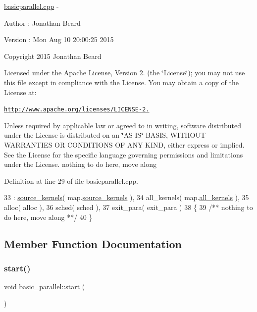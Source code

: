 \hyperlink{basicparallel_8cpp_source}{basicparallel.\+cpp} -\/ \begin{DoxyAuthor}{Author}
\+: Jonathan Beard 
\end{DoxyAuthor}
\begin{DoxyVersion}{Version}
\+: Mon Aug 10 20\+:00\+:25 2015
\end{DoxyVersion}
Copyright 2015 Jonathan Beard

Licensed under the Apache License, Version 2. (the \char`\"{}\+License\char`\"{}); you may not use this file except in compliance with the License. You may obtain a copy of the License at\+:

\href{http://www.apache.org/licenses/LICENSE-2.0}{\tt http\+://www.\+apache.\+org/licenses/\+L\+I\+C\+E\+N\+S\+E-\/2.}

Unless required by applicable law or agreed to in writing, software distributed under the License is distributed on an \char`\"{}\+A\+S I\+S\char`\"{} B\+A\+S\+IS, W\+I\+T\+H\+O\+UT W\+A\+R\+R\+A\+N\+T\+I\+ES OR C\+O\+N\+D\+I\+T\+I\+O\+NS OF A\+NY K\+I\+ND, either express or implied. See the License for the specific language governing permissions and limitations under the License. nothing to do here, move along 

Definition at line 29 of file basicparallel.\+cpp.


\begin{DoxyCode}
33    : \hyperlink{classbasic__parallel_a969b8832b2f6eaea5e985d4582d9e4dc}{source\_kernels}( map.\hyperlink{class_map_base_a2541cb37a237e66fc88129f9f0b02f50}{source\_kernels} ),
34      all\_kernels(    map.\hyperlink{class_map_base_a2220cd630c5d00708f08d9bc70a48220}{all\_kernels} ),
35      alloc( alloc ),
36      sched( sched ),
37      exit\_para( exit\_para )
38 \{\textcolor{comment}{}
39 \textcolor{comment}{   /** nothing to do here, move along **/}
40 \}
\end{DoxyCode}


\subsection{Member Function Documentation}
\hypertarget{classbasic__parallel_a85ea2560d40ad50482468e39d626a52b}{}\label{classbasic__parallel_a85ea2560d40ad50482468e39d626a52b} 
\subsubsection{\texorpdfstring{start()}{start()}}
{\footnotesize\ttfamily void basic\+\_\+parallel\+::start (\begin{DoxyParamCaption}{ }\end{DoxyParamCaption})\hspace{0.3cm}{\ttfamily [virtual]}}

